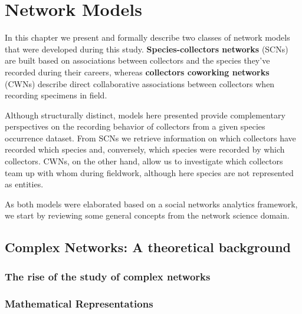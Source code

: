 \chapter{Network Models}\label{network_models}







In this chapter we present and formally describe two classes of network models that were developed during this study.
\textbf{Species-collectors networks} (SCNs) are built based on associations between collectors and the species they've recorded during their careers, whereas \textbf{collectors coworking networks} (CWNs) describe direct collaborative associations between collectors when recording specimens in field.

Although structurally distinct, models here presented provide complementary perspectives on the recording behavior of collectors from a given species occurrence dataset. 
From SCNs we retrieve information on which collectors have recorded which species and, conversely, which species were recorded by which collectors. 
CWNs, on the other hand, allow us to investigate which collectors team up with whom during fieldwork, although here species are not represented as entities.

As both models were elaborated based on a social networks analytics framework, we start by reviewing some general concepts from the network science domain.


\section{Complex Networks: A theoretical background}
\subsection{The rise of the study of complex networks}

\subsection{Mathematical Representations}

